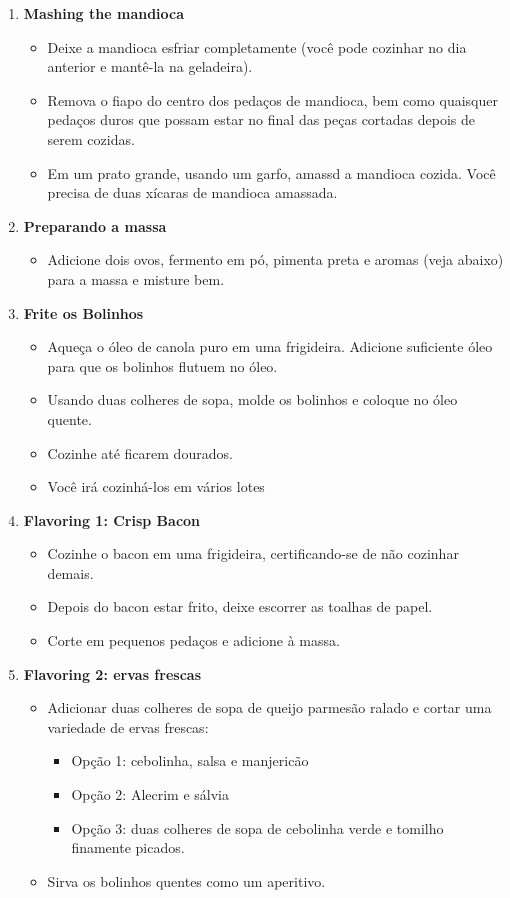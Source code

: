 \documentclass [11pt, letterpaper] {article}
\begin{document}
\begin {description}
\begin {enumerate}
\begin {itemize}
\end {itemize}
\item {\bf Mashing the mandioca}
\begin {itemize}
\item Deixe a mandioca esfriar completamente (você pode cozinhar no dia anterior e mantê-la na geladeira).
\item Remova o fiapo do centro dos pedaços de mandioca, bem como quaisquer peda\c{c}os duros que possam estar no final das peças cortadas depois de serem cozidas.
\item Em um prato grande, usando um garfo, amassd a mandioca cozida. Você precisa de duas xícaras de mandioca amassada.
\end {itemize}
\item {\bf Preparando a massa}
\begin {itemize}
\item Adicione dois ovos, fermento em pó, pimenta preta e aromas (veja abaixo) para a massa e misture bem.
\end {itemize}
\item {\bf Frite os Bolinhos}
\begin {itemize}
\item Aque\c{c}a o óleo de canola puro em uma frigideira. Adicione suficiente óleo para que os bolinhos flutuem no óleo.
\item Usando duas colheres de sopa, molde os bolinhos e coloque no óleo quente.
\item Cozinhe até ficarem dourados.
\item Você irá cozinhá-los em vários lotes
\end {itemize}
\item {\bf Flavoring 1: Crisp Bacon}
\begin {itemize}
\item Cozinhe o bacon em uma frigideira, certificando-se de não cozinhar demais.
\item Depois do bacon estar frito, deixe escorrer as toalhas de papel.
\item Corte em pequenos pedaços e adicione à massa.
\end {itemize}
\item {\bf Flavoring 2: ervas frescas}
\begin {itemize}
\item Adicionar duas colheres de sopa de queijo parmesão ralado e cortar uma variedade de ervas frescas:
\begin {itemize}
\item Opção 1: cebolinha, salsa e manjericão
\item Opção 2: Alecrim e sálvia
\item Opção 3: duas colheres de sopa de cebolinha verde e tomilho finamente picados.
\end {itemize}
\item Sirva os bolinhos quentes como um aperitivo.
\end {itemize}
\end {enumerate}
\end {description}
\end{document}
